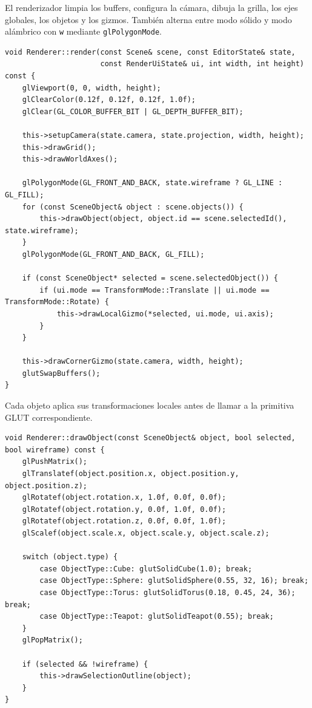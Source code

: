 \documentclass[a4paper,12pt]{article}
\begin{document}
El renderizador limpia los buffers, configura la cámara, dibuja la grilla, los ejes globales, los objetos y los gizmos. También alterna entre modo sólido y modo alámbrico con \texttt{w} mediante \texttt{glPolygonMode}.


\begin{lstlisting}
void Renderer::render(const Scene& scene, const EditorState& state,
                      const RenderUiState& ui, int width, int height) const {
    glViewport(0, 0, width, height);
    glClearColor(0.12f, 0.12f, 0.12f, 1.0f);
    glClear(GL_COLOR_BUFFER_BIT | GL_DEPTH_BUFFER_BIT);

    this->setupCamera(state.camera, state.projection, width, height);
    this->drawGrid();
    this->drawWorldAxes();

    glPolygonMode(GL_FRONT_AND_BACK, state.wireframe ? GL_LINE : GL_FILL);
    for (const SceneObject& object : scene.objects()) {
        this->drawObject(object, object.id == scene.selectedId(), state.wireframe);
    }
    glPolygonMode(GL_FRONT_AND_BACK, GL_FILL);

    if (const SceneObject* selected = scene.selectedObject()) {
        if (ui.mode == TransformMode::Translate || ui.mode == TransformMode::Rotate) {
            this->drawLocalGizmo(*selected, ui.mode, ui.axis);
        }
    }

    this->drawCornerGizmo(state.camera, width, height);
    glutSwapBuffers();
}
\end{lstlisting}

Cada objeto aplica sus transformaciones locales antes de llamar a la primitiva GLUT correspondiente.

\begin{lstlisting}
void Renderer::drawObject(const SceneObject& object, bool selected, bool wireframe) const {
    glPushMatrix();
    glTranslatef(object.position.x, object.position.y, object.position.z);
    glRotatef(object.rotation.x, 1.0f, 0.0f, 0.0f);
    glRotatef(object.rotation.y, 0.0f, 1.0f, 0.0f);
    glRotatef(object.rotation.z, 0.0f, 0.0f, 1.0f);
    glScalef(object.scale.x, object.scale.y, object.scale.z);

    switch (object.type) {
        case ObjectType::Cube: glutSolidCube(1.0); break;
        case ObjectType::Sphere: glutSolidSphere(0.55, 32, 16); break;
        case ObjectType::Torus: glutSolidTorus(0.18, 0.45, 24, 36); break;
        case ObjectType::Teapot: glutSolidTeapot(0.55); break;
    }
    glPopMatrix();

    if (selected && !wireframe) {
        this->drawSelectionOutline(object);
    }
}
\end{lstlisting}
\end{document}

